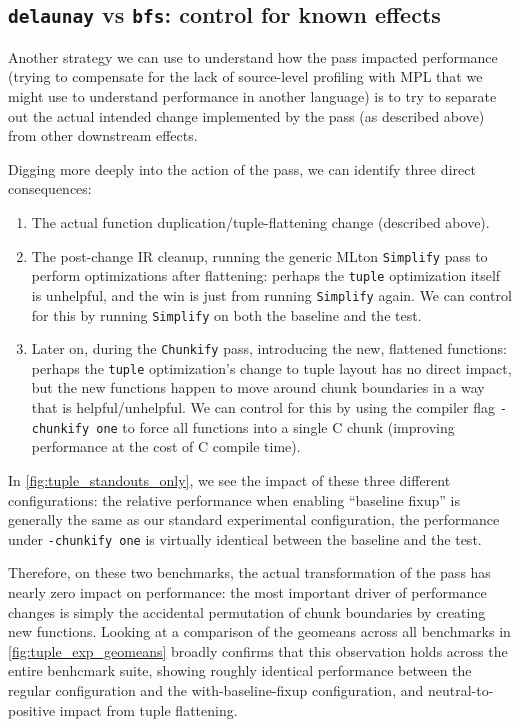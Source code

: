 \subsection{\texttt{delaunay} vs \texttt{bfs}: control for known effects}
Another strategy we can use to understand how the pass impacted performance
(trying to compensate for the lack of source-level profiling with MPL that we
might use to understand performance in another language) is to try to separate
out the actual intended change implemented by the pass (as described above) from
other downstream effects.

Digging more deeply into the action of the pass, we can identify three direct
consequences:
\begin{enumerate}
\item The actual function duplication/tuple-flattening change (described above).

\item The post-change IR cleanup, running the generic MLton \texttt{Simplify}
  pass to perform optimizations after flattening: perhaps the \texttt{tuple}
  optimization itself is unhelpful, and the win is just from running
  \texttt{Simplify} again. We can control for this by running \texttt{Simplify}
  on both the baseline and the test.

\item Later on, during the \texttt{Chunkify} pass, introducing the new,
  flattened functions: perhaps the \texttt{tuple} optimization's change to tuple
  layout has no direct impact, but the new functions happen to move around chunk
  boundaries in a way that is helpful/unhelpful. We can control for this by
  using the compiler flag \texttt{-chunkify one} to force all functions into a
  single C chunk (improving performance at the cost of C compile time).

\end{enumerate}

In \cref{fig:tuple_standouts_only}, we see the impact of these three different
configurations: the relative performance when enabling ``baseline fixup'' is
generally the same as our standard experimental configuration, the performance
under \texttt{-chunkify one} is virtually identical between the baseline and the
test.

Therefore, on these two benchmarks, the actual transformation of the pass has
nearly zero impact on performance: the most important driver of performance
changes is simply the accidental permutation of chunk boundaries by creating new
functions. Looking at a comparison of the geomeans across all benchmarks in
\cref{fig:tuple_exp_geomeans} broadly confirms that this observation holds
across the entire benhcmark suite, showing roughly identical performance between
the regular configuration and the with-baseline-fixup configuration, and
neutral-to-positive impact from tuple flattening.

